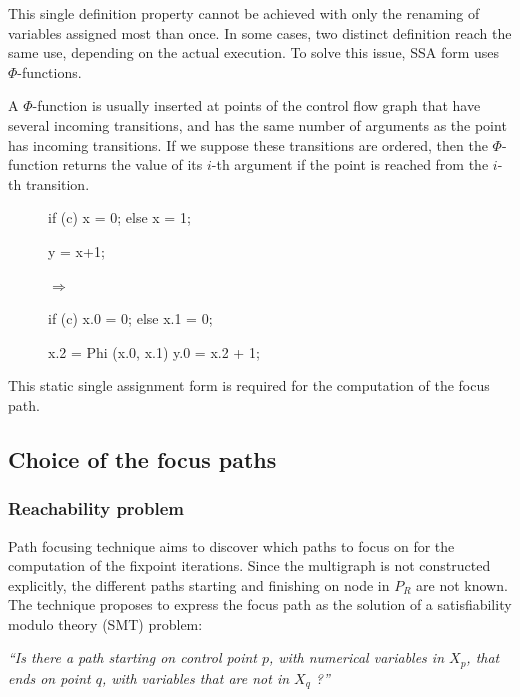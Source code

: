 \documentclass[a4paper,english,titlepage,11pt]{article}
\begin{document}
This single definition property cannot be achieved with only the renaming of
variables assigned most than once. In some cases, two distinct definition reach
the same use, depending on the actual execution. To solve this issue, SSA form
uses $\Phi$-functions.

A $\Phi$-function is usually inserted at points of the control flow graph that
have several incoming transitions, and has the same number of arguments as the point
has incoming transitions. If we suppose these transitions are ordered, then the
$\Phi$-function returns the value of its $i$-th argument if the point is reached
from the $i$-th transition.

\begin{figure}[!h]
\centering
\begin{minipage}[c]{.39\linewidth}
\begin{C}
if (c) x = 0;
else x = 1;

y = x+1;
\end{C}
\end{minipage} 
$\Longrightarrow$ \hfill
\begin{minipage}[c]{.49\linewidth}
\begin{C}
if (c) x.0 = 0;
else x.1 = 0;

x.2 = Phi (x.0, x.1)
y.0 = x.2 + 1;
\end{C}
\end{minipage}
\end{figure}
\FloatBarrier

This static single assignment form is required for the computation of the focus
path.

	\subsection{Choice of the focus paths}

	\subsubsection{Reachability problem}
	\label{reachability}
	Path focusing technique aims to discover which paths to focus on for the
	computation of the fixpoint iterations. 
	Since the multigraph is not constructed explicitly, the different paths
	starting and finishing on node in $P_R$ are not known. 
	The technique proposes to express the focus path as the solution of a
	satisfiability modulo theory (SMT) problem:

	\begin{center} \emph{
		``Is there a path starting on control point $p$, with numerical
		variables in $X_p$, that ends on point $q$, with variables that are not
		in $X_q$ ?''}
	\end{center}
\end{document}
